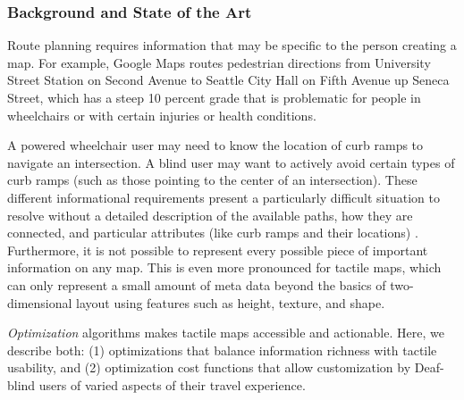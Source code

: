 
\subsubsection{Background and State of the Art}

Route planning requires information that may be specific to the person
creating a map. For example, Google Maps routes pedestrian directions
from University Street Station on Second Avenue to Seattle City Hall
on Fifth Avenue up Seneca Street, which has a steep 10 percent grade
that is problematic for people in wheelchairs or with certain injuries
or health conditions. 

A powered wheelchair user may need to know the location of curb ramps to navigate an intersection. A blind user may want to actively avoid certain types of curb ramps (such as those pointing to the center of an intersection). These different informational requirements present a particularly difficult situation to resolve without a detailed description of the available paths, how they are connected, and particular attributes (like curb ramps and their locations) \cite{bolten2017}. Furthermore, it is not possible to represent every possible piece of important information on any map. This is even more pronounced for tactile maps, which can only represent a small amount of meta data beyond the basics of two-dimensional layout using features such as height, texture, and shape. 

\textit{Optimization} algorithms makes tactile maps accessible and actionable.  Here, we describe both: (1) optimizations that balance information richness with tactile usability, and (2) optimization cost functions that allow customization by Deaf-blind users of varied aspects of their travel experience.


